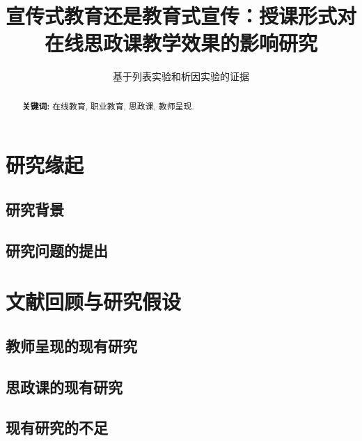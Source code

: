\documentclass[
  12pt,
]{ctexart}
\title{宣传式教育还是教育式宣传：授课形式对在线思政课教学效果的影响研究}
\subtitle{基于列表实验和析因实验的证据}
\author{}
\date{\vspace{-2.5em}}
\begin{document}
\maketitle
\begin{abstract}
\textbf{关键词:} 在线教育, 职业教育, 思政课, 教师呈现.
\end{abstract}

\hypertarget{ux7814ux7a76ux7f18ux8d77}{%
\section{研究缘起}\label{ux7814ux7a76ux7f18ux8d77}}

\hypertarget{ux7814ux7a76ux80ccux666f}{%
\subsection{研究背景}\label{ux7814ux7a76ux80ccux666f}}

\hypertarget{ux7814ux7a76ux95eeux9898ux7684ux63d0ux51fa}{%
\subsection{研究问题的提出}\label{ux7814ux7a76ux95eeux9898ux7684ux63d0ux51fa}}

\hypertarget{ux6587ux732eux56deux987eux4e0eux7814ux7a76ux5047ux8bbe}{%
\section{文献回顾与研究假设}\label{ux6587ux732eux56deux987eux4e0eux7814ux7a76ux5047ux8bbe}}

\hypertarget{ux6559ux5e08ux5448ux73b0ux7684ux73b0ux6709ux7814ux7a76}{%
\subsection{教师呈现的现有研究}\label{ux6559ux5e08ux5448ux73b0ux7684ux73b0ux6709ux7814ux7a76}}

\hypertarget{ux601dux653fux8bfeux7684ux73b0ux6709ux7814ux7a76}{%
\subsection{思政课的现有研究}\label{ux601dux653fux8bfeux7684ux73b0ux6709ux7814ux7a76}}

\hypertarget{ux73b0ux6709ux7814ux7a76ux7684ux4e0dux8db3}{%
\subsection{现有研究的不足}\label{ux73b0ux6709ux7814ux7a76ux7684ux4e0dux8db3}}
\end{document}
